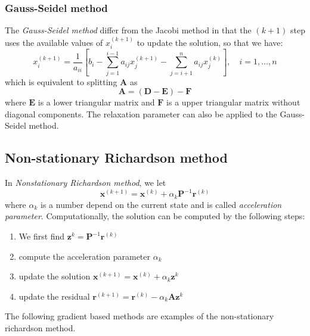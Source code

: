 \documentclass{article}
\begin{document}
\subsubsection{Gauss-Seidel method}
The \emph{Gauss-Seidel method} differ from the Jacobi method in that the $(k+1)$
step uses the available values of $x_i^{(k+1)}$ to update the solution, so that 
we have:
\begin{equation}
    x_i^{(k+1)} = \frac{1}{a_{ii}}\left[
        b_i - \sum_{j=1}^{i-1}a_{ij}x_j^{(k+1)} - \sum_{j = i+1}^n a_{ij}x_j^{(k)}
    \right], \quad i = 1, \dots, n
\end{equation}
which is equivalent to splitting $\mathbf{A}$ as 
\begin{equation*}
    \mathbf{A} = (\mathbf{D}-\mathbf{E}) - \mathbf{F}  
\end{equation*}
where $\mathbf{E}$ is a 
lower triangular matrix and $\mathbf{F}$ is a upper triangular matrix without
diagonal components. 
The relaxation parameter can also be applied to the Gauss-Seidel method.

\subsection{Non-stationary Richardson method}
In \emph{Nonstationary Richardson method}, we let
\begin{equation}
    \mathbf{x}^{(k+1)} = \mathbf{x}^{(k)} + \alpha_k \mathbf{P}^{-1}\mathbf{r}^{(k)}
\end{equation}
where $\alpha_k$ is a number depend on the current state and is 
called \emph{acceleration parameter}. Computationally, the solution can be computed 
by the following steps:
\begin{enumerate}
    \item We first find $\mathbf{z}^{k} = \mathbf{P}^{-1}\mathbf{r}^{(k)}$
    \item compute the acceleration parameter $\alpha_k$
    \item update the solution $\mathbf{x}^{(k+1)} = \mathbf{x}^{(k)} + \alpha_k \mathbf{z}^{k}$
    \item update the residual $\mathbf{r}^{(k+1)} = \mathbf{r}^{(k)} - \alpha_k \mathbf{A} \mathbf{z}^{k}$ 
\end{enumerate}
The following gradient based methods are examples of the non-stationary richardson method.
\end{document}
